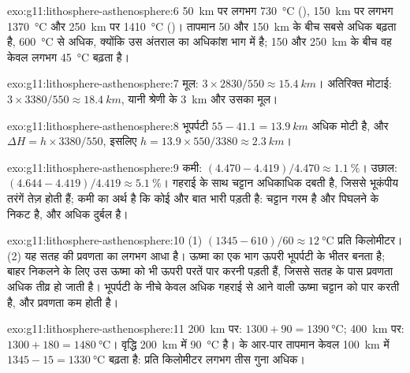 \begin{solution}{exo:g11:lithosphere-asthenosphere:6}
\qty{50}{km} पर लगभग \qty{730}{\celsius} (),
\qty{150}{km} पर लगभग \qty{1370}{\celsius} और \qty{250}{km} पर
\qty{1410}{\celsius} ()। तापमान 50 और
\qty{150}{km} के बीच सबसे अधिक बढ़ता है, \qty{600}{\celsius} से अधिक, क्योंकि उस
अंतराल का अधिकांश भाग  में है; 150 और \qty{250}{km} के बीच वह
केवल लगभग \qty{45}{\celsius} बढ़ता है।
\end{solution}

\begin{solution}{exo:g11:lithosphere-asthenosphere:7}
मूल: $3 \times 2830/550 \approx \qty{15.4}{km}$। अतिरिक्त मोटाई:
$3 \times 3380/550 \approx \qty{18.4}{km}$, यानी श्रेणी के \qty{3}{km}
और उसका मूल।
\end{solution}

\begin{solution}{exo:g11:lithosphere-asthenosphere:8}
भूपर्पटी $55 - 41.1 = \qty{13.9}{km}$ अधिक मोटी है, और $\Delta H = h
\times 3380/550$, इसलिए $h = 13.9 \times 550/3380 \approx \qty{2.3}{km}$।
\end{solution}

\begin{solution}{exo:g11:lithosphere-asthenosphere:9}
कमी: $(4.470 - 4.419)/4.470 \approx \qty{1.1}{\percent}$। उछाल:
$(4.644 - 4.419)/4.419 \approx \qty{5.1}{\percent}$। गहराई के साथ चट्टान
अधिकाधिक दबती है, जिससे भूकंपीय तरंगें तेज़ होती हैं; कमी का अर्थ है
कि कोई और बात भारी पड़ती है: चट्टान गरम है और पिघलने के निकट है, और अधिक दुर्बल है।
\end{solution}

\begin{solution}{exo:g11:lithosphere-asthenosphere:10}
(1) $(1345 - 610)/60 \approx \qty{12}{\celsius}$ प्रति किलोमीटर। (2) यह
सतह की प्रवणता का लगभग आधा है। ऊष्मा का एक भाग ऊपरी
भूपर्पटी के भीतर बनता है; बाहर निकलने के लिए उस ऊष्मा को भी ऊपरी परतें पार करनी पड़ती हैं, जिससे
सतह के पास प्रवणता अधिक तीव्र हो जाती है। भूपर्पटी के नीचे केवल अधिक गहराई से आने वाली
ऊष्मा चट्टान को पार करती है, और प्रवणता कम होती है।
\end{solution}

\begin{solution}{exo:g11:lithosphere-asthenosphere:11}
\qty{200}{km} पर: $1300 + 90 = \qty{1390}{\celsius}$; \qty{400}{km} पर:
$1300 + 180 = \qty{1480}{\celsius}$। वृद्धि \qty{200}{km} में \qty{90}{\celsius}
है।  के आर-पार तापमान केवल \qty{100}{km} में
$1345 - 15 = \qty{1330}{\celsius}$ बढ़ता है: प्रति किलोमीटर लगभग तीस
गुना अधिक।
\end{solution}


